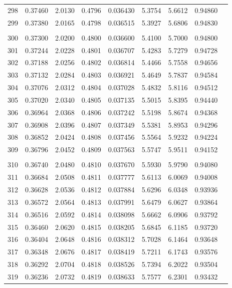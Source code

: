 \documentclass[letter,twosides,10pt]{article}
\begin{document}
\begin{longtable}{|c|c|c|c|c|c|c|c|c|}
298 & 0.37460 & 2.0130 & 0.4796 & 0.036430 & 5.3754 &  5.6612 & 0.94860 \\
299 & 0.37380 & 2.0165 & 0.4798 & 0.036515 & 5.3927 &  5.6806 & 0.94830 \\
 & & & & & & & \\
300 & 0.37300 & 2.0200 & 0.4800 & 0.036600 & 5.4100 &  5.7000 & 0.94800 \\
301 & 0.37244 & 2.0228 & 0.4801 & 0.036707 & 5.4283 &  5.7279 & 0.94728 \\
302 & 0.37188 & 2.0256 & 0.4802 & 0.036814 & 5.4466 &  5.7558 & 0.94656 \\
303 & 0.37132 & 2.0284 & 0.4803 & 0.036921 & 5.4649 &  5.7837 & 0.94584 \\
304 & 0.37076 & 2.0312 & 0.4804 & 0.037028 & 5.4832 &  5.8116 & 0.94512 \\
305 & 0.37020 & 2.0340 & 0.4805 & 0.037135 & 5.5015 &  5.8395 & 0.94440 \\
306 & 0.36964 & 2.0368 & 0.4806 & 0.037242 & 5.5198 &  5.8674 & 0.94368 \\
307 & 0.36908 & 2.0396 & 0.4807 & 0.037349 & 5.5381 &  5.8953 & 0.94296 \\
308 & 0.36852 & 2.0424 & 0.4808 & 0.037456 & 5.5564 &  5.9232 & 0.94224 \\
309 & 0.36796 & 2.0452 & 0.4809 & 0.037563 & 5.5747 &  5.9511 & 0.94152 \\
 & & & & & & & \\
310 & 0.36740 & 2.0480 & 0.4810 & 0.037670 & 5.5930 &  5.9790 & 0.94080 \\
311 & 0.36684 & 2.0508 & 0.4811 & 0.037777 & 5.6113 &  6.0069 & 0.94008 \\
312 & 0.36628 & 2.0536 & 0.4812 & 0.037884 & 5.6296 &  6.0348 & 0.93936 \\
313 & 0.36572 & 2.0564 & 0.4813 & 0.037991 & 5.6479 &  6.0627 & 0.93864 \\
314 & 0.36516 & 2.0592 & 0.4814 & 0.038098 & 5.6662 &  6.0906 & 0.93792 \\
315 & 0.36460 & 2.0620 & 0.4815 & 0.038205 & 5.6845 &  6.1185 & 0.93720 \\
316 & 0.36404 & 2.0648 & 0.4816 & 0.038312 & 5.7028 &  6.1464 & 0.93648 \\
317 & 0.36348 & 2.0676 & 0.4817 & 0.038419 & 5.7211 &  6.1743 & 0.93576 \\
318 & 0.36292 & 2.0704 & 0.4818 & 0.038526 & 5.7394 &  6.2022 & 0.93504 \\
319 & 0.36236 & 2.0732 & 0.4819 & 0.038633 & 5.7577 &  6.2301 & 0.93432 \\

\end{longtable}
\end{document}
